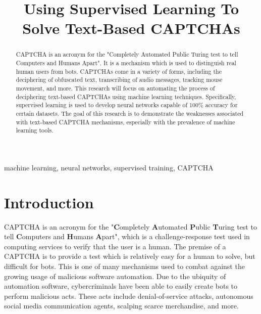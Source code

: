 \documentclass[11pt,conference]{IEEEtran}
\begin{document}
\title{Using Supervised Learning To Solve Text-Based CAPTCHAs\\
}

\author{
}

\maketitle

\begin{abstract}
    CAPTCHA is an acronym for the "Completely Automated Public Turing test
    to tell Computers and Humans Apart". It is a mechanism which is used to
    distinguish real human users from bots. CAPTCHAs come in a variety of forms,
    including the deciphering of obfuscated text, transcribing of audio messages,
    tracking mouse movement, and more. This research will focus on automating the
    process of deciphering text-based CAPTCHAs using machine learning
    techniques. Specifically, supervised learning is used to develop
    neural networks capable of 100\% accuracy for certain datasets. The goal of
    this research is to demonstrate the weaknesses associated with text-based
    CAPTCHA mechanisms, especially with the prevalence of machine learning
    tools.
\end{abstract}

\begin{IEEEkeywords}
    machine learning, neural networks, supervised training, CAPTCHA
\end{IEEEkeywords}

\section{Introduction}
CAPTCHA is an acronym for the "\textbf{C}ompletely \textbf{A}utomated
\textbf{P}ublic \textbf{T}uring test to tell
\textbf{C}omputers and \textbf{H}umans \textbf{A}part", which is a
challenge-response test used in computing services to verify that the user is a
human. The premise of a CAPTCHA is to provide a test which is relatively easy
for a human to solve, but difficult for bots. This is one of many 
mechanisms used to combat against the growing usage of malicious software
automation. Due to the ubiquity of automation software, cybercriminals have
been able to easily create bots to perform malicious acts. These acts include
denial-of-service attacks, autonomous social media communication agents,
scalping scarce merchandise, and more.
\end{document}
